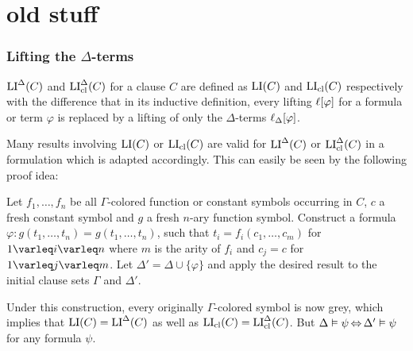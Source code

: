 \documentclass[,%
	draft=false,%
	numbers=noendperiod
	11pt,
	a4paper,
	oneside,%
	openany,
]{memoir}
\begin{document}




\part*{old stuff}

\section{Lifting the $\Delta$-terms}

\begin{defi}
	$\operatorname{LI}^\Delta(C)$ and $\operatorname{LI}_{\operatorname{cl}}^\Delta(C)$ for a clause $C$ are defined as $\operatorname{LI}(C)$ and $\operatorname{LI}_{\operatorname{cl}}(C)$ respectively with the difference that in its inductive definition, every lifting $\ell[\varphi]$ for a formula or term $\varphi$ is replaced by a lifting of only the $\Delta$-terms $\ell_{\Delta}[\varphi]$.
\end{defi}


\tiny
\begin{remark}
	Many results involving $\operatorname{LI}(C)$ or $\operatorname{LI}_{\operatorname{cl}}(C)$ are valid for $\operatorname{LI}^\Delta(C)$ or $\operatorname{LI}_{\operatorname{cl}}^\Delta(C)$
	in a formulation which is adapted accordingly.
	This can easily be seen by the following proof idea:

	Let $f_1, \dots, f_n$ be all $\Gamma$-colored function or constant symbols occurring in $C$,
	$c$ a fresh constant symbol and $g$ a fresh $n$-ary function symbol.
	Construct a formula $\varphi:  g(t_1, \dots, t_n) = g(t_1, \dots, t_n)$,
	such that $t_i = f_i(c_1, \dots, c_m)$ for $1\varleq i \varleq n$ where $m$ is the arity of $f_i$ and $c_j = c$ for $1\varleq j \varleq m$. Let $\Delta' = \Delta \cup \{\varphi\}$ and apply the desired result to the initial clause sets $\Gamma$ and $\Delta'$.

	Under this construction, every originally $\Gamma$-colored symbol is now grey, which implies that $\operatorname{LI}(C) = \operatorname{LI}^\Delta(C)$ as well as $\operatorname{LI}_{\operatorname{cl}}(C) = \operatorname{LI}_{\operatorname{cl}}^\Delta(C)$.
	But $\Delta\vDash \psi \operatorname{\Leftrightarrow} \Delta'\vDash \psi$ for any formula $\psi$.
\end{remark}
\end{document}
